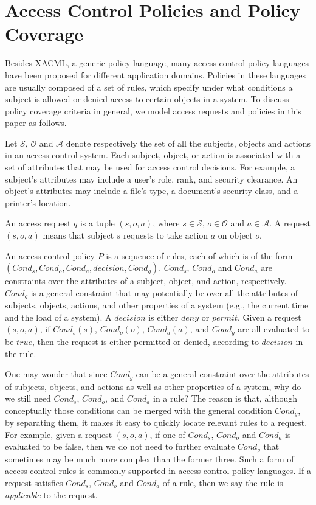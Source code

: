 \section{Access Control Policies and Policy Coverage}
\label{sec:model}

Besides XACML, a generic policy language, many access control policy
languages have been proposed for different application domains.
Policies in these languages are usually composed of a set of rules,
which specify under what conditions a subject is allowed or denied
access to certain objects in a system. To discuss policy coverage
criteria in general, we model access requests and policies in this
paper as follows.

Let $\mathcal{S}$, $\mathcal{O}$ and $\mathcal{A}$ denote
respectively the set of all the subjects, objects and actions in an
access control system. Each subject, object, or action is associated
with a set of attributes that may be used for access control
decisions. For example, a subject's attributes may include a user's
role, rank, and security clearance. An object's attributes may
include a file's type, a document's security class, and a printer's
location.

An access request $q$ is a tuple $(s, o, a)$, where $s \in
\mathcal{S}$, $o \in \mathcal{O}$ and $a \in \mathcal{A}$.
A request $(s, o, a)$ means that
subject $s$ requests to take action $a$ on object $o$.

An access control policy $P$ is a sequence of rules, each of which
is of the form $(Cond_s, Cond_o, Cond_a, decision, Cond_g)$.
$Cond_s$, $Cond_o$ and $Cond_a$ are constraints over the attributes
of a subject, object, and action, respectively. $Cond_g$ is a
general constraint that may potentially be over all the attributes
of subjects, objects, actions, and other properties of a system
(e.g., the current time and the load of a system). A $decision$ is
either $deny$ or $permit$. Given a request $(s,o,a)$, if
$Cond_s(s)$, $Cond_o(o)$, $Cond_a(a)$, and $Cond_g$ are all
evaluated to be $true$, then the request is either permitted or
denied, according to $decision$ in the rule.

One may wonder that since $Cond_g$ can be a general constraint over
the attributes of subjects, objects, and actions as well as other
properties of a system, why do we still need $Cond_s$, $Cond_o$, and
$Cond_a$ in a rule? The reason is that, although conceptually those
conditions can be merged with the general condition $Cond_g$, by
separating them, it makes it easy to quickly locate relevant rules
to a request. For example, given a request $(s,o,a)$, if one of
$Cond_s$, $Cond_o$ and $Cond_a$ is evaluated to be false, then we do
not need to further evaluate $Cond_g$ that sometimes may be much
more complex than the former three. Such a form of access control
rules is commonly supported in access control policy languages. If a
request satisfies $Cond_s$, $Cond_o$ and $Cond_a$ of a rule, then we
say the rule is {\em applicable} to the request.

